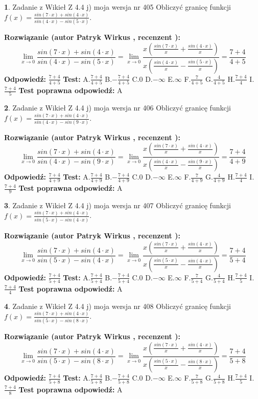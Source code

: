 \documentclass[12pt, a4paper]{article}
\theoremstyle{definition} %
\newtheorem{zad}{}
\newcommand{\zadStart}[1]{\begin{zad}#1\newline}
\newcommand{\zadStop}{\end{zad}}
\newcommand{\rozwStart}[2]{\noindent \textbf{Rozwiązanie (autor #1 , recenzent #2): }\newline}
\newcommand{\rozwStop}{\newline}
\newcommand{\odpStart}{\noindent \textbf{Odpowiedź:}\newline}
\newcommand{\odpStop}{\newline}
\newcommand{\testStart}{\noindent \textbf{Test:}\newline}
\newcommand{\testStop}{\newline}
\newcommand{\kluczStart}{\noindent \textbf{Test poprawna odpowiedź:}\newline}
\newcommand{\kluczStop}{\newline}
\begin{document}
\zadStart{Zadanie z Wikieł Z 4.4 j) moja wersja nr 405}
Obliczyć granicę funkcji $f(x)=\frac{sin(7\cdot x) +sin(4\cdot x)}{sin(4\cdot x) -sin(5\cdot x)}$.
\zadStop
\rozwStart{Patryk Wirkus}{}
$$\lim\limits_{x\to 0}\frac{sin(7\cdot x) +sin(4\cdot x)}{sin(4\cdot x) -sin(5\cdot x)}=\lim\limits_{x\to 0}\frac{x(\frac{sin(7\cdot x)}{x}+\frac{sin(4\cdot x)}{x})}{x(\frac{sin(4\cdot x)}{x}-\frac{sin(5\cdot x)}{x})}=\frac{7+4}{4+5}$$
\rozwStop
\odpStart
$\frac{7+4}{4+5}$
\odpStop
\testStart
A.$\frac{7+4}{4+5}$
B.$-\frac{7+4}{4+5}$
C.$0$
D.$-\infty$
E.$\infty$
F.$\frac{7}{4+5}$
G.$\frac{4}{4+5}$
H.$\frac{7+4}{4}$
I.$\frac{7+4}{5}$
\testStop
\kluczStart
A
\kluczStop



\zadStart{Zadanie z Wikieł Z 4.4 j) moja wersja nr 406}
Obliczyć granicę funkcji $f(x)=\frac{sin(7\cdot x) +sin(4\cdot x)}{sin(4\cdot x) -sin(9\cdot x)}$.
\zadStop
\rozwStart{Patryk Wirkus}{}
$$\lim\limits_{x\to 0}\frac{sin(7\cdot x) +sin(4\cdot x)}{sin(4\cdot x) -sin(9\cdot x)}=\lim\limits_{x\to 0}\frac{x(\frac{sin(7\cdot x)}{x}+\frac{sin(4\cdot x)}{x})}{x(\frac{sin(4\cdot x)}{x}-\frac{sin(9\cdot x)}{x})}=\frac{7+4}{4+9}$$
\rozwStop
\odpStart
$\frac{7+4}{4+9}$
\odpStop
\testStart
A.$\frac{7+4}{4+9}$
B.$-\frac{7+4}{4+9}$
C.$0$
D.$-\infty$
E.$\infty$
F.$\frac{7}{4+9}$
G.$\frac{4}{4+9}$
H.$\frac{7+4}{4}$
I.$\frac{7+4}{9}$
\testStop
\kluczStart
A
\kluczStop



\zadStart{Zadanie z Wikieł Z 4.4 j) moja wersja nr 407}
Obliczyć granicę funkcji $f(x)=\frac{sin(7\cdot x) +sin(4\cdot x)}{sin(5\cdot x) -sin(4\cdot x)}$.
\zadStop
\rozwStart{Patryk Wirkus}{}
$$\lim\limits_{x\to 0}\frac{sin(7\cdot x) +sin(4\cdot x)}{sin(5\cdot x) -sin(4\cdot x)}=\lim\limits_{x\to 0}\frac{x(\frac{sin(7\cdot x)}{x}+\frac{sin(4\cdot x)}{x})}{x(\frac{sin(5\cdot x)}{x}-\frac{sin(4\cdot x)}{x})}=\frac{7+4}{5+4}$$
\rozwStop
\odpStart
$\frac{7+4}{5+4}$
\odpStop
\testStart
A.$\frac{7+4}{5+4}$
B.$-\frac{7+4}{5+4}$
C.$0$
D.$-\infty$
E.$\infty$
F.$\frac{7}{5+4}$
G.$\frac{4}{5+4}$
H.$\frac{7+4}{5}$
I.$\frac{7+4}{4}$
\testStop
\kluczStart
A
\kluczStop



\zadStart{Zadanie z Wikieł Z 4.4 j) moja wersja nr 408}
Obliczyć granicę funkcji $f(x)=\frac{sin(7\cdot x) +sin(4\cdot x)}{sin(5\cdot x) -sin(8\cdot x)}$.
\zadStop
\rozwStart{Patryk Wirkus}{}
$$\lim\limits_{x\to 0}\frac{sin(7\cdot x) +sin(4\cdot x)}{sin(5\cdot x) -sin(8\cdot x)}=\lim\limits_{x\to 0}\frac{x(\frac{sin(7\cdot x)}{x}+\frac{sin(4\cdot x)}{x})}{x(\frac{sin(5\cdot x)}{x}-\frac{sin(8\cdot x)}{x})}=\frac{7+4}{5+8}$$
\rozwStop
\odpStart
$\frac{7+4}{5+8}$
\odpStop
\testStart
A.$\frac{7+4}{5+8}$
B.$-\frac{7+4}{5+8}$
C.$0$
D.$-\infty$
E.$\infty$
F.$\frac{7}{5+8}$
G.$\frac{4}{5+8}$
H.$\frac{7+4}{5}$
I.$\frac{7+4}{8}$
\testStop
\kluczStart
A
\kluczStop
\end{document}
